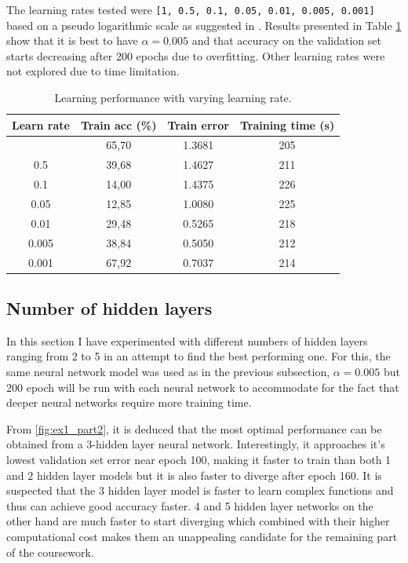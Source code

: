 \documentclass{article}
\begin{document}
The learning rates tested were \texttt{[1, 0.5, 0.1, 0.05, 0.01, 0.005, 0.001]} based on a pseudo logarithmic scale as suggested in \citep{overviewML}. Results presented in Table \ref{tab:ex1-learn} show that it is  best to have $\alpha = 0.005$ and that accuracy on the validation set starts decreasing after 200 epochs due to overfitting. Other learning rates were not explored due to time limitation.
\begin{table}[tb]
\vskip 3mm
\begin{center}
\begin{small}
\begin{sc}
\begin{tabular}{cccc}
\hline
\abovespace\belowspace
Learn rate & Train acc (\%) & Train error & Training time (s) \\
\hline
\abovespace
1          & 65,70 & 1.3681 & 205 \\
0.5        & 39,68 & 1.4627 & 211 \\
0.1        & 14,00 & 1.4375 & 226 \\
0.05       & 12,85 & 1.0080 & 225 \\
0.01       & 29,48 & 0.5265 & 218 \\
0.005      & 38,84 & 0.5050 & 212 \\
0.001      & 67,92 & 0.7037 & 214 \\
\hline
\end{tabular}
\end{sc}
\end{small}
\caption{Learning performance with varying learning rate.}
\label{tab:ex1-learn}
\end{center}
\vskip -3mm
\end{table}

\subsection{Number of hidden layers}
In this section I have experimented with different numbers of hidden layers ranging from 2 to 5 in an attempt to find the best performing one. For this, the same neural network model was used as in the previous subsection,  $\alpha = 0.005$ but 200 epoch will be run with each neural network to accommodate for the fact that deeper neural networks require more training time.

From \ref{fig:ex1_part2}, it is deduced that the most optimal performance can be obtained from a 3-hidden layer neural network. Interestingly, it approaches it's lowest validation set error near epoch 100, making it faster to train than both 1 and 2 hidden layer models but it is also faster to diverge after epoch 160. It is suspected that the 3 hidden layer model is faster to learn complex functions and thus can achieve good accuracy faster. 4 and 5 hidden layer networks on the other hand are much faster to start diverging which combined with their higher computational cost makes them an unappealing candidate for the remaining part of the coursework.
\end{document}
